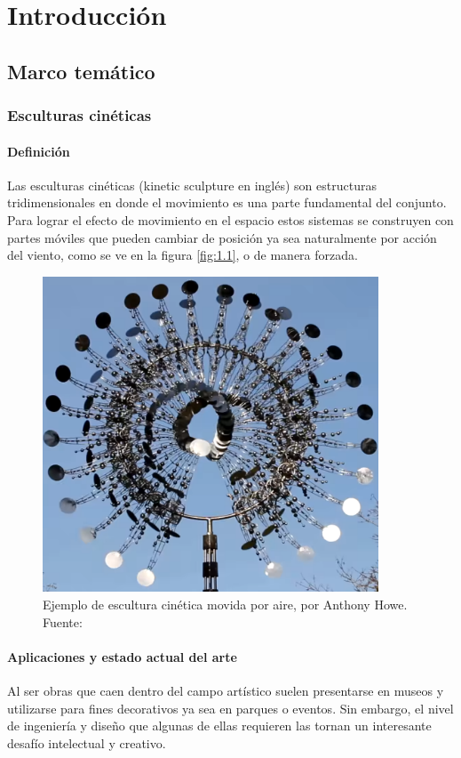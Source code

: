 \chapter{Introducción}
\thispagestyle{empty}


\section{Marco temático} \label{sec:\thesection}
\subsection{Esculturas cinéticas}
\subsubsection{Definición}
Las esculturas cinéticas (kinetic sculpture en inglés) son estructuras tridimensionales en donde el movimiento es una parte fundamental del conjunto. Para lograr el efecto de movimiento en el espacio estos sistemas se construyen con partes móviles que pueden cambiar de posición ya sea naturalmente por acción del viento, como se ve en la figura \ref{fig:1.1}, o de manera forzada.

\begin{figure}[!ht]
	\centering
	\includegraphics[width=10cm,scale=1]{resources/1_1-kinSculp.png}
	\caption{ Ejemplo de escultura cinética movida por aire, por Anthony Howe. Fuente:  \cite{fig1_1} }
	\label{fig:\thefigure}
\end{figure}

\newpage
\subsubsection{Aplicaciones y estado actual del arte}
Al ser obras que caen dentro del campo artístico suelen presentarse en museos y utilizarse para fines decorativos ya sea en parques o eventos. Sin embargo, el nivel de ingeniería y diseño que algunas de ellas requieren las tornan un interesante desafío intelectual y creativo.

